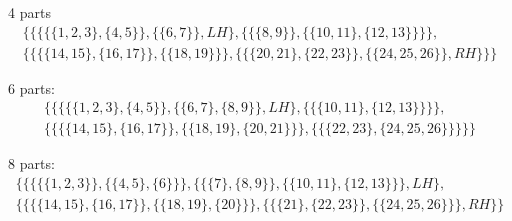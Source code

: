 4 parts
\begin{align*}
\Bigg\{\bigg\{\Big\{\big\{\{1,2,3\},\{4,5\}\big\},\big\{\{6,7\}\big\}, LH\Big\},\Big\{\big\{\{8,9\}\big\},\big\{\{10,11\},\{12,13\}\big\}\Big\}\bigg\},\\
\bigg\{\Big\{\big\{\{14,15\},\{16,17\}\big\},\big\{\{18,19\}\big\}\Big\},\Big\{\big\{\{20,21\},\{22,23\}\big\},\big\{\{24,25,26\}\big\}, RH\Big\}\bigg\}\Bigg\}
\end{align*}

6 parts:
\begin{align*}
\Bigg\{\bigg\{\Big\{\big\{\{1,2,3\},\{4,5\}\big\},\big\{\{6,7\},\{8,9\}\big\}, LH\Big\},\Big\{\big\{\{10,11\},\{12,13\}\big\}\Big\}\bigg\},
\\
\bigg\{\Big\{\big\{\{14,15\},\{16,17\}\big\},\big\{\{18,19\},\{20,21\}\big\}\Big\},\Big\{\big\{\{22,23\},\{24,25,26\}\big\}\Big\}\bigg\}\Bigg\}
\end{align*}

8 parts:
\begin{align*}
\Bigg\{\Bigg\{\bigg\{\Big\{\{1,2,3\}\Big\},\Big\{\{4,5\},\{6\}\Big\}\bigg\},\bigg\{\Big\{\{7\},\{8,9\}\Big\},\Big\{\{10,11\},\{12,13\}\Big\}\bigg\},LH\Bigg\},\\
\Bigg\{\bigg\{\Big\{\{14,15\},\{16,17\}\Big\},\Big\{\{18,19\},\{20\}\Big\}\bigg\},\bigg\{\Big\{\{21\},\{22,23\}\Big\},\Big\{\{24,25,26\}\Big\}\bigg\},RH\Bigg\}\Bigg\}
\end{align*}





